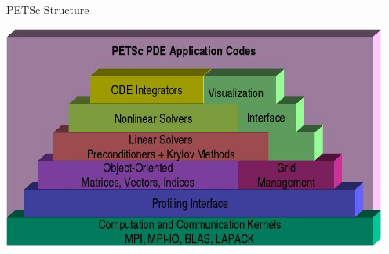 \begin{frame}{PETSc Structure}

\begin{center}
\includegraphics[width=5.0in]{figures/PETSc/PETScPyramid}
\end{center}

\end{frame}
